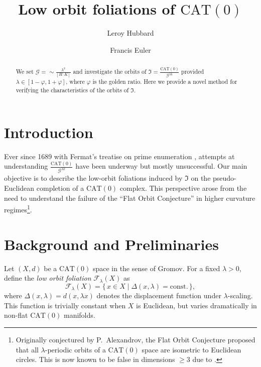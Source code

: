 \documentclass{amsart}
\title{Low orbit foliations of $\mathrm{CAT}(0)$}
\author{Leroy Hubbard}
\author{Francis Euler}
\begin{document}
\begin{abstract}
We set $\mathcal{G} = \sim\frac{\lambda^2}{[H : K]}$ and investigate the orbits of 
$\mathfrak{I} = \frac{\mathrm{CAT}(0)}{\mathcal{G}^{\lambda k}}$ 
provided $\lambda \in [1-\varphi, 1+\varphi]$, where $\varphi$ is the golden ratio. 
Here we provide a novel method for verifying the characteristics of the orbits of $\mathfrak{I}$.
\end{abstract}

\maketitle


\section{Introduction}

Ever since 1689 with Fermat's treatise on prime enumeration \cite{fermat89}, 
attempts at understanding $\frac{\mathrm{CAT}(0)}{\mathcal{G}^{\lambda k}}$ have been underway but mostly unsuccessful. 
Our main objective is to describe the low-orbit foliations induced by $\mathfrak{I}$ on 
the pseudo-Euclidean completion of a $\mathrm{CAT}(0)$ complex. 
This perspective arose from the need to understand the failure of the ``Flat Orbit Conjecture'' in higher curvature %
regimes\footnote{
Originally conjectured by P.\ Alexandrov, the Flat Orbit Conjecture proposed that all $\lambda$-periodic orbits of a $\mathrm{CAT}(0)$ space are isometric to Euclidean circles. 
This is now known to be false in dimensions $\geq 3$ due to \cite{hubard23}.}.

\section{Background and Preliminaries}



Let %
$(X,d)$ be a $\mathrm{CAT}(0)$ space in %
the sense of Gromov. %
For a fixed $\lambda > 0$, define the \emph{low orbit foliation} $\mathcal{F}_\lambda(X)$ as
\begin{equation}\label{eq:foliation}
    \mathcal{F}_\lambda(X) = \{\,x \in X \mid \Delta(x, \lambda) = \text{const.}\,\},
\end{equation}
where $\Delta(x, \lambda) = d(x, \lambda x)$ denotes the displacement function under $\lambda$-scaling.  
This function is trivially constant when $X$ is Euclidean, but varies dramatically in non-flat $\mathrm{CAT}(0)$ %
manifolds.
\end{document}
